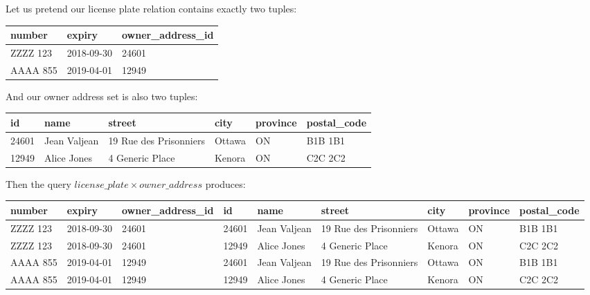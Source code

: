 Let us pretend our license plate relation contains exactly two tuples:

\begin{center}
\begin{tabular}{|l|l|l|}\hline
	\textbf{number} & \textbf{expiry} & \textbf{owner\_address\_id} \\ \hline
	ZZZZ 123 & 2018-09-30 & 24601 \\ \hline
	AAAA 855 & 2019-04-01 & 12949 \\ \hline
\end{tabular}
\end{center}

And our owner address set is also two tuples: 

\begin{center}
	\begin{tabular}{|l|l|l|l|l|l|}\hline
		\textbf{id} & \textbf{name} &\textbf{street} & \textbf{city} & \textbf{province} & \textbf{postal\_code} \\ \hline
		24601 & Jean Valjean & 19 Rue des Prisonniers & Ottawa & ON & B1B 1B1\\ \hline
		12949 & Alice Jones & 4 Generic Place & Kenora & ON & C2C 2C2\\ \hline
	\end{tabular}
\end{center}

Then the query $license\_plate \times owner\_address$ produces:

{\scriptsize
\begin{center}
	\begin{tabular}{|l|l|l|l|l|l|l|l|l|}\hline
		\textbf{number} & \textbf{expiry} & \textbf{owner\_address\_id} & \textbf{id} & \textbf{name} &\textbf{street} & \textbf{city} & \textbf{province} & \textbf{postal\_code} \\ \hline
		ZZZZ 123 & 2018-09-30 & 24601 & 24601 & Jean Valjean & 19 Rue des Prisonniers & Ottawa & ON & B1B 1B1\\ \hline
ZZZZ 123 & 2018-09-30 & 24601 & 12949 & Alice Jones & 4 Generic Place & Kenora & ON & C2C 2C2\\ \hline
		AAAA 855 & 2019-04-01 & 12949 & 24601 & Jean Valjean & 19 Rue des Prisonniers & Ottawa & ON & B1B 1B1\\ \hline
		AAAA 855 & 2019-04-01 & 12949 & 12949 & Alice Jones & 4 Generic Place & Kenora & ON & C2C 2C2\\ \hline
	\end{tabular}
\end{center}
}

